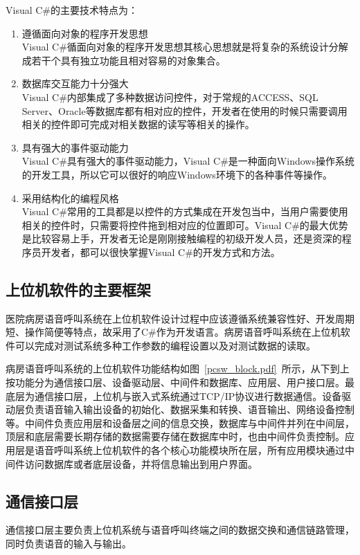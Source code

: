 Visual C{\#}的主要技术特点为：
\begin{enumerate}
\item 遵循面向对象的程序开发思想\\
Visual C{\#}循面向对象的程序开发思想其核心思想就是将复杂的系统设计分解成若干个具有独立功能且相对容易的对象集合。

\item 数据库交互能力十分强大\\
Visual C{\#}内部集成了多种数据访问控件，对于常规的ACCESS、SQL Server、Oracle等数据库都有相对应的控件，开发者在使用的时候只需要调用相关的控件即可完成对相关数据的读写等相关的操作。

\item 具有强大的事件驱动能力\\
Visual C{\#}具有强大的事件驱动能力，Visual C{\#}是一种面向Windows操作系统的开发工具，所以它可以很好的响应Windows环境下的各种事件等操作。

\item 采用结构化的编程风格\\
Visual C{\#}常用的工具都是以控件的方式集成在开发包当中，当用户需要使用相关的控件时，只需要将控件拖到相对应的位置即可。Visual C{\#}的最大优势是比较容易上手，开发者无论是刚刚接触编程的初级开发人员，还是资深的程序员开发者，都可以很快掌握Visual C{\#}的开发方式和方法。
\end{enumerate}

\subsection{上位机软件的主要框架}
医院病房语音呼叫系统在上位机软件设计过程中应该遵循系统兼容性好、开发周期短、操作简便等特点，故采用了C{\#}作为开发语言。病房语音呼叫系统在上位机软件可以完成对测试系统多种工作参数的编程设置以及对测试数据的读取。

病房语音呼叫系统的上位机软件功能结构如图~\ref{pcsw_block.pdf}~所示，从下到上按功能分为通信接口层、设备驱动层、中间件和数据库、应用层、用户接口层。最底层为通信接口层，上位机与嵌入式系统通过TCP/IP协议进行数据通信。设备驱动层负责语音输入输出设备的初始化、数据采集和转换、语音输出、网络设备控制等。中间件负责应用层和设备层之间的信息交换，数据库与中间件并列在中间层，顶层和底层需要长期存储的数据需要存储在数据库中时，也由中间件负责控制。应用层是语音呼叫系统上位机软件的各个核心功能模块所在层，所有应用模块通过中间件访问数据库或者底层设备，并将信息输出到用户界面。

\subsection{通信接口层}
通信接口层主要负责上位机系统与语音呼叫终端之间的数据交换和通信链路管理，同时负责语音的输入与输出。

